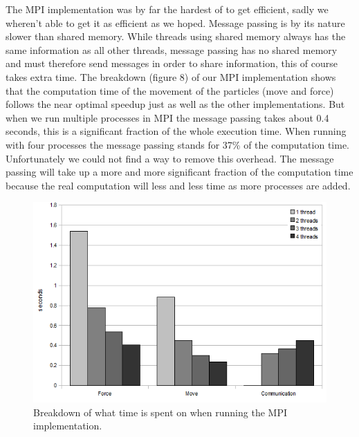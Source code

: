 The MPI implementation was by far the hardest of to get efficient, sadly we
wheren't able to get it as efficient as we hoped. Message passing is by its
nature slower than shared memory. While threads using shared memory always has
the same information as all other threads, message passing has no shared memory
and must therefore send messages in order to share information, this of course
takes extra time. The breakdown (figure 8) of our MPI implementation shows that
the computation time of the movement of the particles (move and force) follows
the near optimal speedup just as well as the other implementations. But when we
run multiple processes in MPI the message passing takes about 0.4 seconds, this
is a significant fraction of the whole execution time. When running with four
processes the message passing stands for 37\% of the computation time.
Unfortunately we could not find a way to remove this overhead. The message
passing will take up a more and more significant fraction of the computation
time because the real computation will less and less time as more processes are
added.

\begin{figure}[H]
    \label{breakdown}
	\includegraphics{mpilol}
	\caption{Breakdown of what time is spent on when running the MPI
    implementation.}
\end{figure}
